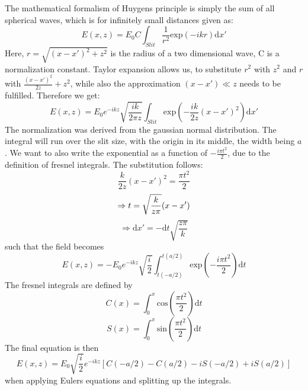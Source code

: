 The mathematical formalism of Huygens principle is simply the sum of all spherical waves, which is for infinitely small distances given as:
\begin{equation}
E(x,z) = E_0 C \int_{Slit} \frac{1}{r^2} \mathrm{exp}(-ikr)\mathrm{d}x'
\end{equation}
Here, $r=\sqrt{(x-x')^2 + z^2}$ is the radius of a two dimensional wave, C is a normalization constant.
Taylor expansion allows us, to substitute $r^2$ with $z^2$ and $r$ with $\frac{(x-x')^2}{2z} + z^2$, while also the approximation $(x-x') \ll z$ needs to be fulfilled. Therefore we get:
\begin{equation}
E(x,z) = E_0 e^{-ikz}\sqrt{\frac{ik}{2\pi z}}\int_{Slit} \mathrm{exp}(-\frac{ik}{2z}(x-x')^2)\mathrm{d}x'
\end{equation}
The normalization was derived from the gaussian normal distribution. The integral will run over the slit size, with the origin in its middle, the width being $a$.
We want to also write the exponential as a function of $-\frac{i\pi t^2}{2}$, due to the definition of fresnel integrals. The substitution follows:
\begin{equation}
\frac{k}{2z}(x-x')^2 = \frac{\pi t^2}{2}
\end{equation}
\begin{equation}
\Rightarrow t = \sqrt{\frac{k}{z\pi}}(x-x') \\
\end{equation}
\begin{equation}
\Rightarrow \mathrm{d}x' = -\mathrm{d}t \sqrt{\frac{z\pi}{k}}
\end{equation}
such that the field becomes
\begin{equation}
E(x,z) = -E_0 e^{-ikz}\sqrt{\frac{i}{2}}\int_{t(-a/2)}^{t(a/2)} \mathrm{exp}(-\frac{i\pi t^2}{2})\mathrm{d}t
\end{equation}
The fresnel integrals are defined by
\begin{equation}
C(x) = \int_0^x \mathrm{cos}(\frac{\pi t^2}{2})\mathrm{d} t
\end{equation}
\begin{equation}
S(x) = \int_0^x \mathrm{sin}(\frac{\pi t^2}{2})\mathrm{d} t
\end{equation}
The final equation is then
\begin{equation}
E(x,z) = E_0 \sqrt{\frac{i}{2}} e^{-ikz} \left [ C(-a/2) - C(a/2) - iS(-a/2) + iS(a/2) \right ]
\end{equation}
when applying Eulers equations and splitting up the integrals.

